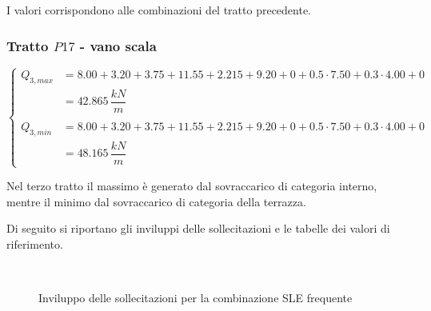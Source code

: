 I valori corrispondono alle combinazioni del tratto precedente.

\subsubsection*{Tratto $P17$ - vano scala}
\begin{equation*}
	\begin{cases}
		Q_{3,max} &= 8.00+3.20+3.75 + 11.55+2.215+9.20 + 0+ 0.5\cdot7.50+ 0.3\cdot4.00 +0\\
		&= 42.865\,\dfrac{kN}{m}\\\\
		Q_{3,min} &= 8.00+3.20+3.75 + 11.55+2.215+9.20 + 0 + 0.5\cdot7.50 +0.3\cdot 4.00 + 0\\
		&= 48.165\,\dfrac{kN}{m}
	\end{cases}
\end{equation*}

Nel terzo tratto il massimo è generato dal sovraccarico di categoria interno, mentre il minimo dal sovraccarico di categoria della terrazza.

Di seguito si riportano gli  inviluppi delle sollecitazioni e le tabelle dei valori di riferimento.

\begin{figure}
	\centering
	\\
	\caption{Inviluppo delle sollecitazioni per la combinazione SLE frequente}
	\label{fig:sleFreqEnvelope}
\end{figure}

